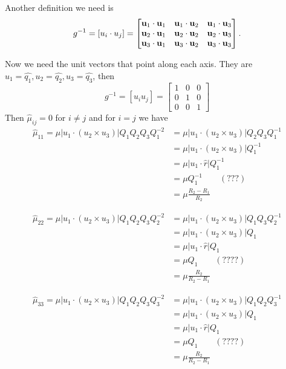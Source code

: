 \documentclass{amsart}
\begin{document}
Another definition we need is
\begin{equation}\label{matrixg}
  g^{-1}=[u_i\cdot u_j]=\begin{bmatrix}
    \textbf{u}_1\cdot \textbf{u}_1 & \textbf{u}_1\cdot \textbf{u}_2 & \textbf{u}_1\cdot \textbf{u}_3 \\
    \textbf{u}_2\cdot \textbf{u}_1 & \textbf{u}_2\cdot \textbf{u}_2 & \textbf{u}_2\cdot \textbf{u}_3 \\
    \textbf{u}_3\cdot \textbf{u}_1 & \textbf{u}_3\cdot \textbf{u}_2 & \textbf{u}_3\cdot \textbf{u}_3
  \end{bmatrix}.
\end{equation}

Now we need the unit vectors that point along each axis. They are $u_1=\widehat{q_1},u_2=\widehat{q_2},u_3=\widehat{q_3}$,
then
\[
  g^{-1}=
  [u_iu_j]=
  \begin{bmatrix}
    1 & 0 & 0\\
    0 & 1 & 0\\
    0 & 0 & 1
  \end{bmatrix}
\]
Then $\hat{\mu}_{ij}=0$ for $i\neq j$ and for $i=j$ we have
\begin{align*}
  \hat{\mu}_{11}=\mu|u_1\cdot(u_2\times u_3)|Q_1Q_2Q_3Q_1^{-2}
  &=\mu|u_1\cdot(u_2\times u_3)|Q_2Q_3Q_1^{-1}\\
  &=\mu|u_1\cdot(u_2\times u_3)|Q_1^{-1}\\
  &=\mu|u_1\cdot\hat{r}|Q_1^{-1}\\
  &=\mu Q_1^{-1}\qquad (???)\\
  &=\mu \frac{R_2-R_1}{R_2}
\end{align*}

\begin{align*}
  \hat{\mu}_{22}=\mu|u_1\cdot(u_2\times u_3)|Q_1Q_2Q_3Q_2^{-2}
  &=\mu|u_1\cdot(u_2\times u_3)|Q_1Q_3Q_2^{-1}\\
  &=\mu|u_1\cdot(u_2\times u_3)|Q_1\\
  &=\mu|u_1\cdot\hat{r}|Q_1\\
  &=\mu Q_1\qquad (????)\\
  &=\mu \frac{R_2}{R_2-R_1}
\end{align*}

\begin{align*}
  \hat{\mu}_{33}=\mu|u_1\cdot(u_2\times u_3)|Q_1Q_2Q_3Q_3^{-2}
  &=\mu|u_1\cdot(u_2\times u_3)|Q_1Q_2Q_3^{-1}\\
  &=\mu|u_1\cdot(u_2\times u_3)|Q_1\\
  &=\mu|u_1\cdot\hat{r}|Q_1\\
  &=\mu Q_1\qquad (????)\\
  &=\mu \frac{R_2}{R_2-R_1}
\end{align*}

\end{document}
